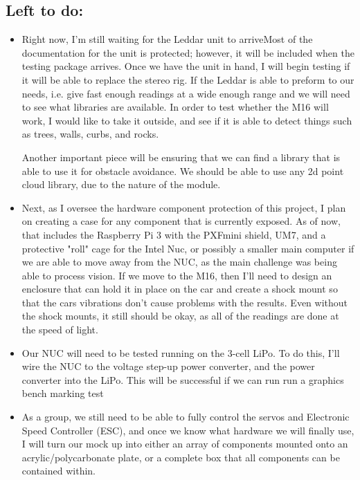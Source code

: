 \documentclass[compsoc,draftclsnofoot,onecolumn,10pt]{IEEEtran}
\begin{document}
	\subsection{Left to do:}
		\begin{itemize}
				\item Right now, I'm still waiting for the Leddar unit to arriveMost of the documentation for the unit is protected; however, it will be included when the testing package arrives. 
					Once we have the unit in hand, I will begin testing if it will be able to replace the stereo rig. 
					If the Leddar is able to preform to our needs, i.e. give fast enough readings at a wide enough range and we will need to see what libraries are available. 
					In order to test whether the M16 will work, I would like to take it outside, and see if it is able to detect things such as trees, walls, curbs, and rocks.
					
					Another important piece will be ensuring that we can find a library that is able to use it for obstacle avoidance. 
					We should be able to use any 2d point cloud library, due to the nature of the module.
			
				\item Next, as I oversee the hardware component protection of this project, I plan on creating a case for any component that is currently exposed. 
					As of now, that includes the Raspberry Pi 3 with the PXFmini shield, UM7, and a protective "roll" cage for the Intel Nuc, or possibly a smaller main computer if we are able to move away from the NUC, as the main challenge was being able to process vision. 
					If we move to the M16, then I'll need to design an enclosure that can hold it in place on the car and create a shock mount so that the cars vibrations don't cause problems with the results. 
					Even without the shock mounts, it still should be okay, as all of the readings are done at the speed of light. 
					
				\item Our NUC will need to be tested running on the 3-cell LiPo. To do this, I'll wire the NUC to the voltage step-up power converter, and the power converter into the LiPo. 
					This will be successful if we can run run a graphics bench marking test 
		
				\item As a group, we still need to be able to fully control the servos and Electronic Speed Controller (ESC), and once we know what hardware we will finally use, I will turn our mock up into either an array of components mounted onto an acrylic/polycarbonate plate, or a complete box that all components can be contained within. 
		\end{itemize}
		
\end{document}
